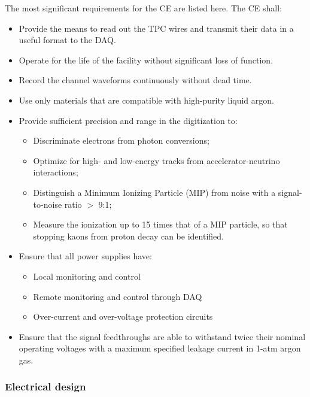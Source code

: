 The most significant requirements for the CE are listed here. The CE shall:

\begin{itemize}	
\item Provide the means to read out the TPC wires and transmit their data in a useful format to the DAQ.
\item Operate for the life of the facility without significant loss of function.
\item Record the channel waveforms continuously without dead time.
\item Use only materials that are compatible with high-purity liquid argon.
\item Provide sufficient precision and range in the digitization to:
\begin{itemize}
\item Discriminate electrons from photon conversions;
\item Optimize for high- and low-energy tracks from accelerator-neutrino interactions;
\item Distinguish a Minimum Ionizing Particle (MIP) from noise with a signal-to-noise ratio $>$ 9:1;
\item Measure the ionization up to 15 times that of a MIP particle, so that stopping kaons from proton decay can be identified.
\end{itemize}
\item Ensure that all power supplies have: 
\begin{itemize}
\item Local monitoring and control
\item Remote monitoring and control through DAQ
\item Over-current and over-voltage protection circuits
\end{itemize}
\item Ensure that the signal feedthroughs are able to withstand twice their nominal operating voltages 
with a maximum specified leakage current in 1-atm argon gas.
\end{itemize}


\subsubsection{Electrical design}
\label{subsec:ele_design}

